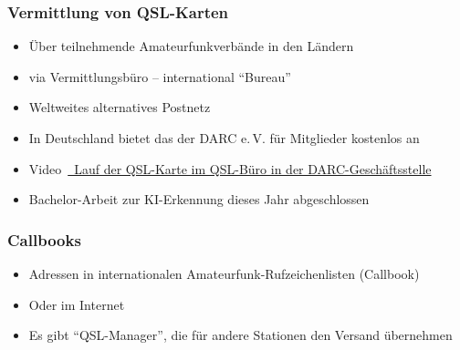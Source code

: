 \begin{frame}
\end{frame}

\begin{frame}
    \frametitle{Vermittlung von QSL-Karten}
    \begin{itemize}
        \item Über teilnehmende Amateurfunkverbände in den Ländern
        \item via Vermittlungsbüro -- international \enquote{Bureau}
        \item Weltweites alternatives Postnetz
        \item In Deutschland bietet das der DARC e.\,V. für Mitglieder kostenlos an
        \item Video~\href{https://www.youtube.com/watch?v=uKniAqKQ1xw}{\textcolor{DARCblue}{\faLink~Lauf der QSL-Karte im QSL-Büro in der DARC-Geschäftsstelle}}
        \item Bachelor-Arbeit zur KI-Erkennung dieses Jahr abgeschlossen
    \end{itemize}
\end{frame}

\begin{frame}
    \frametitle{Callbooks}
    \begin{itemize}
        \item Adressen in internationalen Amateurfunk-Rufzeichenlisten (Callbook)
        \item Oder im Internet
        \item Es gibt \enquote{QSL-Manager}, die für andere Stationen den Versand übernehmen
    \end{itemize}
\end{frame}

